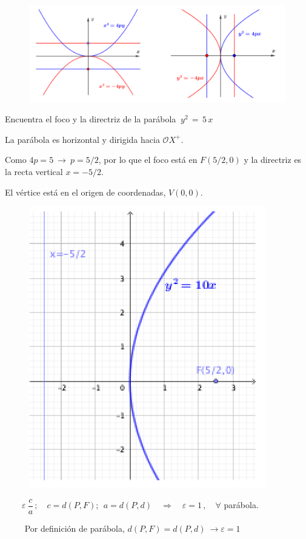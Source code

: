 \begin{figure}[H]
	\centering
	\includegraphics[width=.75\textwidth]{img-conicas/conicas04.png}
	\end{figure}

\begin{miejemplo}

Encuentra el foco y la directriz de la parábola $\ y^2\, =\, 5\, x$


  
\vspace{2mm}

\begin{multicols}{2}
La parábola es horizontal y dirigida hacia $\mathcal OX^+$. 

Como $4p=5 \ \to \ p=5/2$, por lo que el foco está en $F(5/2,0)$ y la directriz es la recta vertical $x=-5/2$. 

El vértice está en el origen de coordenadas, $V(0,0)$.	
\begin{figure}[H]
	\centering
	\includegraphics[width=.25\textwidth]{img-conicas/conicas05.png}
	\end{figure}	
\end{multicols}
\end{miejemplo}

\vspace{5mm}

\begin{theorem}

$\qquad \varepsilon \ \dfrac c a\, ; \quad c=d(P,F);\ \ a=d(P,d) \quad \Rightarrow \quad \varepsilon=1 \, , \quad \forall	 $ parábola.

\vspace{4mm} $\qquad$ \textcolor{gris}{Por definición de parábola, $d(P,F)=d(P,d) \ \to \varepsilon=1$ \QED}
\end{theorem}




